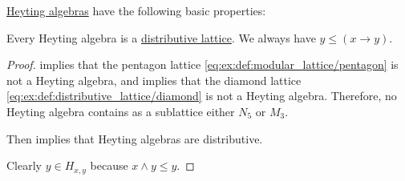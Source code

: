 \begin{proposition}\label{thm:def:heyting_algebra}
  \hyperref[def:heyting_algebra]{Heyting algebras} have the following basic properties:
  \begin{thmenum}
     Every Heyting algebra is a \hyperref[def:distributive_lattice]{distributive lattice}.
     We always have \( y \leq (x \rightarrow y) \).
  \end{thmenum}
\end{proposition}
\begin{proof}
    implies that the pentagon lattice \eqref{eq:ex:def:modular_lattice/pentagon} is not a Heyting algebra, and  implies that the diamond lattice \eqref{eq:ex:def:distributive_lattice/diamond} is not a Heyting algebra. Therefore, no Heyting algebra contains as a sublattice either \( N_5 \) or \( M_3 \).

  Then  implies that Heyting algebras are distributive.

   Clearly \( y \in H_{x,y} \) because \( x \wedge y \leq y \).
\end{proof}

